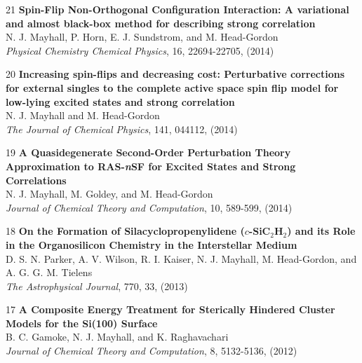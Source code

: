 \documentclass[10pt]{article}
\newenvironment{lonelist}[1][\enskip\textbullet]%
        {\vspace{-\baselineskip}\begin{list}{#1}{%
        \setlength{\partopsep}{0pt}%
        \setlength{\topsep}{0pt}}}
        {\end{list}\vspace{-.6\baselineskip}}
\def\Vhrulefill{\leavevmode\leaders\hrule height 0.7ex depth \dimexpr0.4pt-0.7ex\hfill\kern0pt}
\begin{document}
\begin{lonelist}
%
\item[21\hspace{4pt}] \textbf{Spin-Flip Non-Orthogonal Configuration Interaction: A variational and almost black-box method for describing strong correlation}\\
N. J. Mayhall, P. Horn, E. J. Sundstrom, and M. Head-Gordon\\
\textsl{Physical Chemistry Chemical Physics}, 16, 22694-22705, (2014)


\item[20\hspace{4pt}] \textbf{Increasing spin-flips and decreasing cost: Perturbative corrections for external singles to the complete 
		active space spin flip model for low-lying excited states and strong correlation}\\
N. J. Mayhall and M. Head-Gordon\\
\textsl{The Journal of Chemical Physics}, 141, 044112, (2014)

\item[19\hspace{4pt}] \textbf{A Quasidegenerate Second-Order Perturbation Theory Approximation to RAS-\textsl{n}SF for Excited States and Strong Correlations}\\
N. J. Mayhall, M. Goldey, and M. Head-Gordon\\
\textsl{Journal of Chemical Theory and Computation}, 10, 589-599, (2014)

\item[18\hspace{4pt}] \textbf{On the Formation of Silacyclopropenylidene ($c$-SiC$_2$H$_2$) and its Role in the Organosilicon Chemistry in the Interstellar Medium}\\
D. S. N. Parker, A. V. Wilson, R. I. Kaiser, N. J. Mayhall, M. Head-Gordon, and A. G. G. M. Tielens\\
\textsl{The Astrophysical Journal}, 770, 33, (2013)

\item[17\hspace{4pt}] \textbf{A Composite Energy Treatment for Sterically Hindered Cluster Models for the Si(100) Surface}\\
B. C. Gamoke, N. J. Mayhall, and K. Raghavachari \\
\textsl{Journal of Chemical Theory and Computation}, 8, 5132-5136, (2012)


\end{lonelist}
\end{document}
